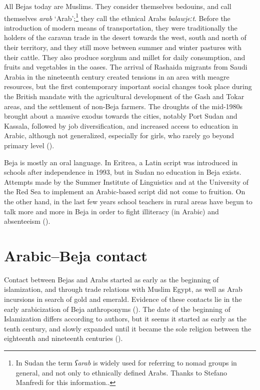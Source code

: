 \documentclass[output=paper]{langsci/langscibook}
\begin{document}
All Bejas today are Muslims. They consider themselves bedouins, and call themselves \textit{arab} ‘Arab’;\footnote{In Sudan the term \textit{ʕarab} is widely used for referring to nomad groups in general, and not only to ethnically defined Arabs. Thanks to Stefano Manfredi for this information..} they call the ethnical Arabs \textit{balawjeːt}. Before the introduction of modern means of transportation, they were traditionally the holders of the caravan trade in the desert towards the west, south and north of their territory, and they still move between summer and winter pastures with their cattle. They also produce sorghum and millet for daily consumption, and fruits and vegetables in the oases. The arrival of Rashaida migrants from Saudi Arabia in the nineteenth century created tensions in an area with meagre resources, but the first contemporary important social changes took place during the British mandate with the agricultural development of the Gash and Tokar areas, and the settlement of non-Beja farmers. The droughts of the mid-1980s brought about a massive exodus towards the cities, notably Port Sudan and Kassala, followed by job diversification, and increased access to education in Arabic, although not generalized, especially for girls, who rarely go beyond primary level (\citealt{HamidAhmed2005book}).

Beja is mostly an oral language. In Eritrea, a Latin script was introduced in schools after independence in 1993, but in Sudan no education in Beja exists. Attempts made by the Summer Institute of Linguistics and at the University of the Red Sea to implement an Arabic-based script did not come to fruition. On the other hand, in the last few years school teachers in rural areas have begun to talk more and more in Beja in order to fight illiteracy (in Arabic) and absenteeism (\citealt{Onour2015}).

\section{Arabic--Beja contact}

Contact between Bejas and Arabs started as early as the beginning of islamization, and through trade relations with Muslim Egypt, as well as Arab incursions in search of gold and emerald. Evidence of these contacts lie in the early arabicization of Beja anthroponyms (\citealt{Záhořík2007}). The date of the beginning of Islamization differs according to authors, but it seems it started as early as the tenth century, and slowly expanded until it became the sole religion between the eighteenth and nineteenth centuries (\citealt{Záhořík2007}).
\end{document}
